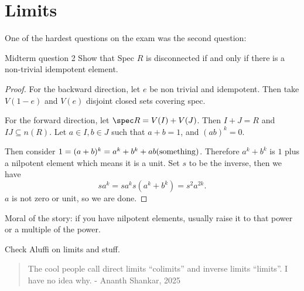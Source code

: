 \section{Limits}
\newcommand{\dlim}{\varinjlim}
\newcommand{\ilim}{\varprojlim}
One of the hardest questions on the exam was the second question:

\begin{aexample}{Midterm question 2}{}
    Show that Spec $R$ is disconnected if and only if there is a non-trivial idempotent element.
\end{aexample}
\begin{proof}
    For the backward direction, let $e$ be non trivial and idempotent. Then take $V(1-e)$ and $V(e)$ disjoint closed sets covering spec.

    For the forward direction, let $\spec R = V(I)+V(J)$. Then $I+J=R$ and $IJ\subseteq n(R)$. Let $a\in I, b\in J$ such that $a+b=1$, and $(ab)^k=0$.

    Then consider $1=(a+b)^k = a^k+b^k + ab(\rm{something})$. Therefore $a^k+b^k$ is $1$ plus a nilpotent element which means it is a unit. Set $s$ to be the inverse, then we have \[
    sa^k = sa^k s(a^k+b^k) = s^2 a^{2k}.
    \]
    $a$ is not zero or unit, so we are done.

\end{proof}
\begin{remark}
    Moral of the story: if you have nilpotent elements, usually raise it to that power or a multiple of the power.
\end{remark}



Check Aluffi on limits and stuff.
\begin{quotation}
    The cool people call direct limits ``colimits'' and inverse limits ``limits''. I have no idea why. - Ananth Shankar, 2025
\end{quotation}


